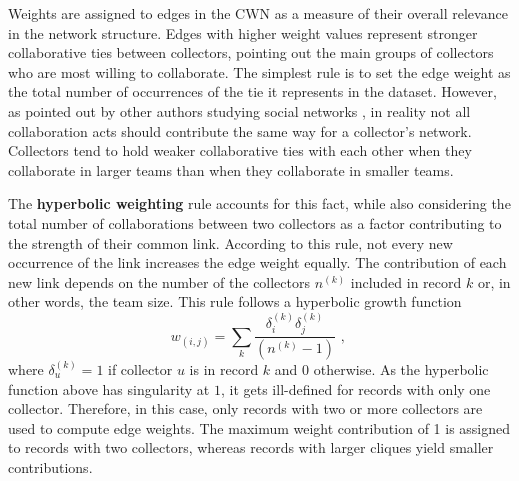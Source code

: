 {Weights are assigned to edges in the CWN as a measure of their overall relevance in the network structure. Edges with higher weight values represent stronger collaborative ties between collectors, pointing out the main groups of collectors who are most willing to collaborate. 
The simplest rule is to set the edge weight as the total number of occurrences of the tie it represents in the dataset. However, as pointed out by other authors studying social networks \cite{Newman2001a}, in reality not all collaboration acts should contribute the same way for a collector's network. 
Collectors tend to hold weaker collaborative ties with each other when they collaborate in larger teams than when they collaborate in smaller teams. 

The \textbf{hyperbolic weighting} rule accounts for this fact, while also considering the total number of collaborations between two collectors as a factor contributing to the strength of their common link.
According to this rule, not every new occurrence of the link increases the edge weight equally. 
The contribution of each new link depends on the number of the collectors $n^{(k)}$ included in record $k$ or, in other words, the team size. 
This rule follows a hyperbolic growth function 
\begin{equation}
w_{(i,j)} = \sum\limits_k \frac{\delta_i^{(k)} \delta_j^{(k)}}{(n^{(k)}-1)} \mbox{ , }
\end{equation}
where $\delta^{(k)}_u = 1$ if collector $u$ is in record $k$ and $0$ otherwise.
As the hyperbolic function above has singularity at $1$, it gets ill-defined for records with only one collector. 
Therefore, in this case, only records with two or more collectors are used to compute edge weights. 
The maximum weight contribution of 1 is assigned to records with two collectors, whereas records with larger cliques yield smaller contributions.

}
